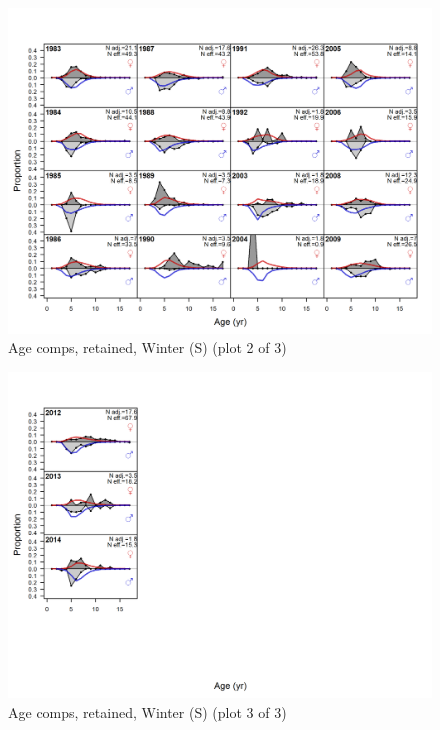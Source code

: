 \documentclass[12pt,]{article}
\begin{document}
\begin{figure}
\centering
\includegraphics{r4ss/plots_mod1/comp_agefit_flt3mkt2_page2.png}
\caption{Age comps, retained, Winter (S) (plot 2 of 3)
\label{fig:age_fits}}
\end{figure}

\begin{figure}
\centering
\includegraphics{r4ss/plots_mod1/comp_agefit_flt3mkt2_page3.png}
\caption{Age comps, retained, Winter (S) (plot 3 of 3)
\label{fig:age_fits}}
\end{figure}
\end{document}
